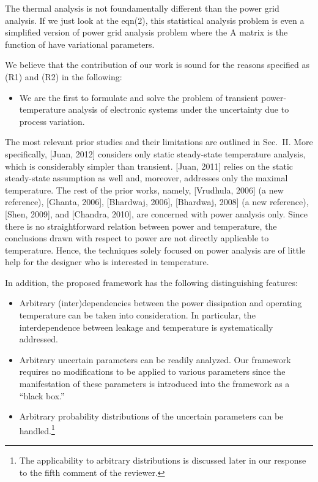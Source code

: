 \begin{reviewer}
The thermal analysis is not foundamentally different than the power grid analysis.  If we just look at the eqn(2), this statistical analysis problem is even a simplified version of power grid analysis problem where the A matrix is the function of have variational parameters.
\end{reviewer}
\begin{authors}
We believe that the contribution of our work is sound for the reasons specified as (R1) and (R2) in the following:
\begin{itemize}
  \item[(R1)] We are the first to formulate and solve the problem of transient power-temperature analysis of electronic systems under the uncertainty due to process variation.
\end{itemize}
The most relevant prior studies and their limitations are outlined in Sec.~II.
More specifically, [Juan, 2012] considers only static steady-state temperature analysis, which is considerably simpler than transient.
[Juan, 2011] relies on the static steady-state assumption as well and, moreover, addresses only the maximal temperature.
The rest of the prior works, namely, [Vrudhula, 2006] (a new reference), [Ghanta, 2006], [Bhardwaj, 2006], [Bhardwaj, 2008] (a new reference), [Shen, 2009], and [Chandra, 2010], are concerned with power analysis only.
Since there is no straightforward relation between power and temperature, the conclusions drawn with respect to power are not directly applicable to temperature.
Hence, the techniques solely focused on power analysis are of little help for the designer who is interested in temperature.

In addition, the proposed framework has the following distinguishing features:
\begin{itemize}
  \item[1.] Arbitrary (inter)dependencies between the power dissipation and operating temperature can be taken into consideration.
  In particular, the interdependence between leakage and temperature is systematically addressed.

  \item[2.] Arbitrary uncertain parameters can be readily analyzed.
  Our framework requires no modifications to be applied to various parameters since the manifestation of these parameters is introduced into the framework as a ``black box.''

  \item[3.] Arbitrary probability distributions of the uncertain parameters can be handled.\footnote{The applicability to arbitrary distributions is discussed later in our response to the fifth comment of the reviewer.}


\end{itemize}
\end{authors}
